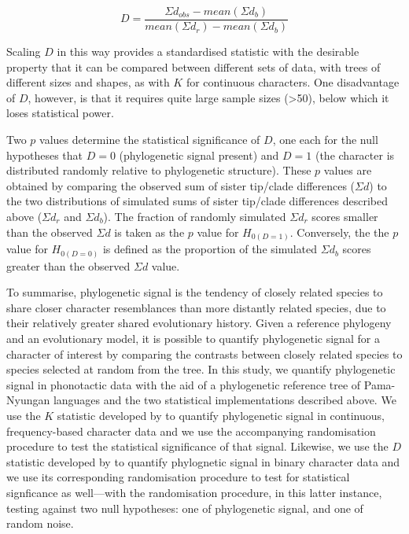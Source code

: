 \begin{equation}
D = \frac{\Sigma d_{obs} - mean\left( \Sigma d_{b} \right)}{mean\left( \Sigma d_{r} \right) - mean\left( \Sigma d_{b} \right)}
\end{equation}

Scaling \(D\) in this way provides a standardised statistic with the desirable property that it can be compared between different sets of data, with trees of different sizes and shapes, as with \(K\) for continuous characters. One disadvantage of \(D\), however, is that it requires quite large sample sizes (\textgreater{}50), below which it loses statistical power.

Two \(p\) values determine the statistical significance of \(D\), one each for the null hypotheses that \(D = 0\) (phylogenetic signal present) and \(D = 1\) (the character is distributed randomly relative to phylogenetic structure). These \(p\) values are obtained by comparing the observed sum of sister tip/clade differences (\(\Sigma d\)) to the two distributions of simulated sums of sister tip/clade differences described above (\(\Sigma d_r\) and \(\Sigma d_b\)). The fraction of randomly simulated \(\Sigma d_r\) scores smaller than the observed \(\Sigma d\) is taken as the \(p\) value for \(H_{0(D=1)}\). Conversely, the the \(p\) value for \(H_{0(D=0)}\) is defined as the proportion of the simulated \(\Sigma d_b\) scores greater than the observed \(\Sigma d\) value.

To summarise, phylogenetic signal is the tendency of closely related species to share closer character resemblances than more distantly related species, due to their relatively greater shared evolutionary history. Given a reference phylogeny and an evolutionary model, it is possible to quantify phylogenetic signal for a character of interest by comparing the contrasts between closely related species to species selected at random from the tree. In this study, we quantify phylogenetic signal in phonotactic data with the aid of a phylogenetic reference tree of Pama-Nyungan languages and the two statistical implementations described above. We use the \(K\) statistic developed by \textcite{blomberg_testing_2003} to quantify phylogenetic signal in continuous, frequency-based character data and we use the accompanying randomisation procedure to test the statistical significance of that signal. Likewise, we use the \(D\) statistic developed by \textcite{fritz_selectivity_2010} to quantify phylognetic signal in binary character data and we use its corresponding randomisation procedure to test for statistical signficance as well---with the randomisation procedure, in this latter instance, testing against two null hypotheses: one of phylogenetic signal, and one of random noise.


